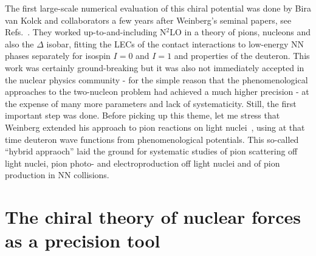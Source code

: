 \documentclass[a4paper,fleqn]{scrartcl}
\begin{document}
{The first large-scale numerical evaluation of this chiral potential
was done by Bira van Kolck and collaborators a few years after Weinberg's
seminal papers, see Refs.~\cite{Ordonez:1993tn}. They worked
up-to-and-including N$^2$LO in a theory of pions, nucleons and also
the $\Delta$ isobar, fitting the  LECs of the contact interactions
to low-energy NN phases separately for isospin $I=0$ and $I=1$ and
properties of the deuteron. This work was certainly
ground-breaking but it was also not immediately accepted in the nuclear physics
community - for the simple reason that the phenomenological approaches
to the two-nucleon problem had achieved a much higher precision - at the
expense of many more parameters and lack of  systematicity. Still, the first
important step was done. Before picking up this theme, let me stress that
Weinberg extended his approach to pion reactions on light 
nuclei~\cite{Weinberg:1992yk}, using at that time deuteron wave functions
from phenomenological potentials. This so-called ``hybrid appraoch'' laid 
the ground for systematic studies of pion scattering off light nuclei, 
pion photo- and electroproduction off light nuclei and of pion production
in NN collisions.  

\section{The chiral theory of nuclear forces as a precision tool}

}
\end{document}
